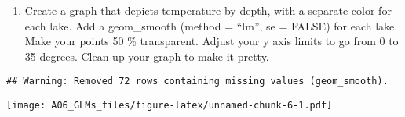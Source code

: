 \documentclass[]{article}
\newenvironment{Shaded}{\begin{snugshade}}{\end{snugshade}}
\newcommand{\KeywordTok}[1]{\textcolor[rgb]{0.13,0.29,0.53}{\textbf{#1}}}
\newcommand{\DataTypeTok}[1]{\textcolor[rgb]{0.13,0.29,0.53}{#1}}
\newcommand{\DecValTok}[1]{\textcolor[rgb]{0.00,0.00,0.81}{#1}}
\newcommand{\FloatTok}[1]{\textcolor[rgb]{0.00,0.00,0.81}{#1}}
\newcommand{\StringTok}[1]{\textcolor[rgb]{0.31,0.60,0.02}{#1}}
\newcommand{\CommentTok}[1]{\textcolor[rgb]{0.56,0.35,0.01}{\textit{#1}}}
\newcommand{\OtherTok}[1]{\textcolor[rgb]{0.56,0.35,0.01}{#1}}
\newcommand{\OperatorTok}[1]{\textcolor[rgb]{0.81,0.36,0.00}{\textbf{#1}}}
\newcommand{\NormalTok}[1]{#1}
\providecommand{\tightlist}{%
  \setlength{\itemsep}{0pt}\setlength{\parskip}{0pt}}
\begin{document}
\begin{enumerate}
\def\labelenumi{\arabic{enumi}.}
\setcounter{enumi}{15}
\tightlist
\item
  Create a graph that depicts temperature by depth, with a separate
  color for each lake. Add a geom\_smooth (method = ``lm'', se = FALSE)
  for each lake. Make your points 50 \% transparent. Adjust your y axis
  limits to go from 0 to 35 degrees. Clean up your graph to make it
  pretty.
\end{enumerate}

\begin{Shaded}
\end{Shaded}

\begin{verbatim}
## Warning: Removed 72 rows containing missing values (geom_smooth).
\end{verbatim}

\texttt{[image: A06\_GLMs\_files/figure-latex/unnamed-chunk-6-1.pdf]}
\end{document}
